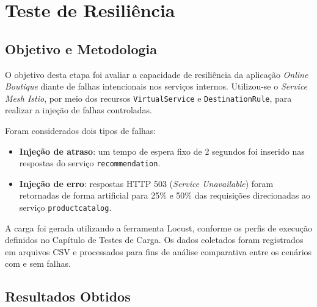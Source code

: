 \documentclass[12pt,a4paper]{report}
\begin{document}


\chapter{Teste de Resiliência}

\section{Objetivo e Metodologia}

O objetivo desta etapa foi avaliar a capacidade de resiliência da aplicação \textit{Online Boutique} diante de falhas intencionais nos serviços internos. Utilizou-se o \textit{Service Mesh Istio}, por meio dos recursos \texttt{VirtualService} e \texttt{DestinationRule}, para realizar a injeção de falhas controladas.

Foram considerados dois tipos de falhas:

\begin{itemize}
    \item \textbf{Injeção de atraso}: um tempo de espera fixo de 2 segundos foi inserido nas respostas do serviço \texttt{recommendation}.
    \item \textbf{Injeção de erro}: respostas HTTP 503 (\textit{Service Unavailable}) foram retornadas de forma artificial para 25\% e 50\% das requisições direcionadas ao serviço \texttt{productcatalog}.
\end{itemize}

A carga foi gerada utilizando a ferramenta Locust, conforme os perfis de execução definidos no Capítulo de Testes de Carga. Os dados coletados foram registrados em arquivos CSV e processados para fins de análise comparativa entre os cenários com e sem falhas.

\section{Resultados Obtidos}
\end{document}
